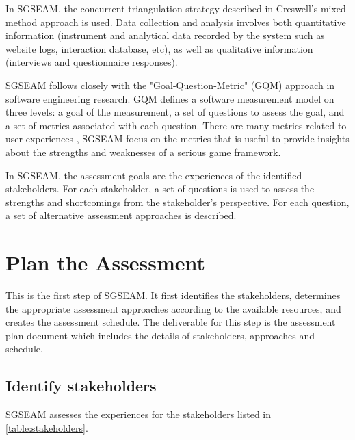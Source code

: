 In SGSEAM, the concurrent triangulation strategy described in Creswell's mixed method approach
is used.  Data collection and analysis involves both quantitative information (instrument and
analytical data recorded by the system such as website logs, interaction database, etc), as well
as qualitative information (interviews and questionnaire responses).

SGSEAM follows closely with the "Goal-Question-Metric" (GQM) approach \cite{caldiera1994goal} in
software engineering research. GQM defines a software  measurement model on three levels: a goal
of the measurement, a set of questions to assess the goal, and a set of metrics associated with
each question. There are many metrics related to user experiences \cite{tullis2010measuring}, SGSEAM
focus on the metrics that is useful to provide insights about the strengths and weaknesses of a serious
game framework.

In SGSEAM, the assessment goals are the experiences of the identified stakeholders. For each
stakeholder, a set of questions is used to assess the strengths and shortcomings from the
stakeholder's perspective. For each question, a set of alternative assessment approaches is
described.

\section{Plan the Assessment}

This is the first step of SGSEAM. It first identifies the stakeholders, determines the appropriate assessment approaches according to the available resources, and creates the assessment schedule. The deliverable for this step is the assessment plan document which includes the details of stakeholders, approaches and schedule.

\subsection{Identify stakeholders}

SGSEAM assesses the experiences for the stakeholders listed in \autoref{table:stakeholders}. 

